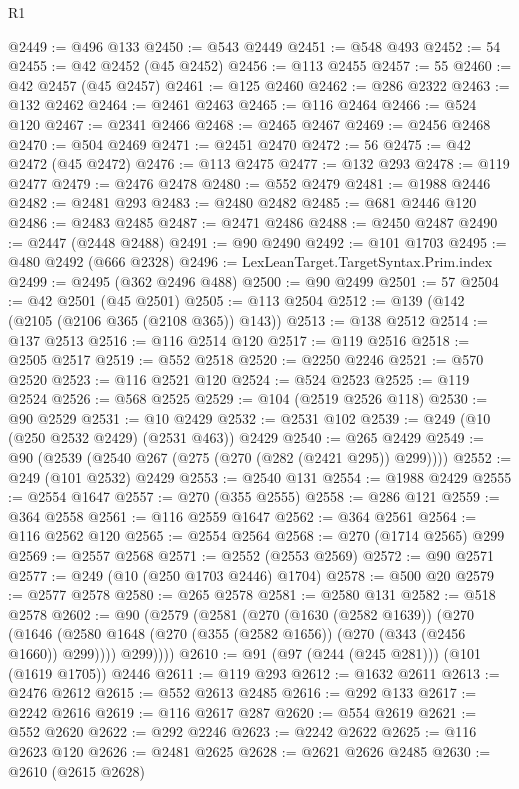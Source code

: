 \begin{lexlean}{R1}
\begin{coremodule}
@2449 := @496 @133
@2450 := @543 @2449
@2451 := @548 @493
@2452 := 54
@2455 := @42 @2452 (@45 @2452)
@2456 := @113 @2455
@2457 := 55
@2460 := @42 @2457 (@45 @2457)
@2461 := @125 @2460
@2462 := @286 @2322
@2463 := @132 @2462
@2464 := @2461 @2463
@2465 := @116 @2464
@2466 := @524 @120
@2467 := @2341 @2466
@2468 := @2465 @2467
@2469 := @2456 @2468
@2470 := @504 @2469
@2471 := @2451 @2470
@2472 := 56
@2475 := @42 @2472 (@45 @2472)
@2476 := @113 @2475
@2477 := @132 @293
@2478 := @119 @2477
@2479 := @2476 @2478
@2480 := @552 @2479
@2481 := @1988 @2446
@2482 := @2481 @293
@2483 := @2480 @2482
@2485 := @681 @2446 @120
@2486 := @2483 @2485
@2487 := @2471 @2486
@2488 := @2450 @2487
@2490 := @2447 (@2448 @2488)
@2491 := @90 @2490
@2492 := @101 @1703
@2495 := @480 @2492 (@666 @2328)
@2496 := LexLeanTarget.TargetSyntax.Prim.index
@2499 := @2495 (@362 @2496 @488)
@2500 := @90 @2499
@2501 := 57
@2504 := @42 @2501 (@45 @2501)
@2505 := @113 @2504
@2512 := @139 (@142 (@2105 (@2106 @365 (@2108 @365)) @143))
@2513 := @138 @2512
@2514 := @137 @2513
@2516 := @116 @2514 @120
@2517 := @119 @2516
@2518 := @2505 @2517
@2519 := @552 @2518
@2520 := @2250 @2246
@2521 := @570 @2520
@2523 := @116 @2521 @120
@2524 := @524 @2523
@2525 := @119 @2524
@2526 := @568 @2525
@2529 := @104 (@2519 @2526 @118)
@2530 := @90 @2529
@2531 := @10 @2429
@2532 := @2531 @102
@2539 := @249 (@10 (@250 @2532 @2429) (@2531 @463)) @2429
@2540 := @265 @2429
@2549 := @90 (@2539 (@2540 @267 (@275 (@270 (@282 (@2421 @295)) @299))))
@2552 := @249 (@101 @2532) @2429
@2553 := @2540 @131
@2554 := @1988 @2429
@2555 := @2554 @1647
@2557 := @270 (@355 @2555)
@2558 := @286 @121
@2559 := @364 @2558
@2561 := @116 @2559 @1647
@2562 := @364 @2561
@2564 := @116 @2562 @120
@2565 := @2554 @2564
@2568 := @270 (@1714 @2565) @299
@2569 := @2557 @2568
@2571 := @2552 (@2553 @2569)
@2572 := @90 @2571
@2577 := @249 (@10 (@250 @1703 @2446) @1704)
@2578 := @500 @20
@2579 := @2577 @2578
@2580 := @265 @2578
@2581 := @2580 @131
@2582 := @518 @2578
@2602 := @90
    (@2579
      (@2581
        (@270
          (@1630 (@2582 @1639))
          (@270
            (@1646 (@2580 @1648 (@270 (@355 (@2582 @1656)) (@270 (@343 (@2456 @1660)) @299))))
            @299))))
@2610 := @91 (@97 (@244 (@245 @281))) (@101 (@1619 @1705)) @2446
@2611 := @119 @293
@2612 := @1632 @2611
@2613 := @2476 @2612
@2615 := @552 @2613 @2485
@2616 := @292 @133
@2617 := @2242 @2616
@2619 := @116 @2617 @287
@2620 := @554 @2619
@2621 := @552 @2620
@2622 := @292 @2246
@2623 := @2242 @2622
@2625 := @116 @2623 @120
@2626 := @2481 @2625
@2628 := @2621 @2626 @2485
@2630 := @2610 (@2615 @2628)

\end{coremodule}
\end{lexlean}
